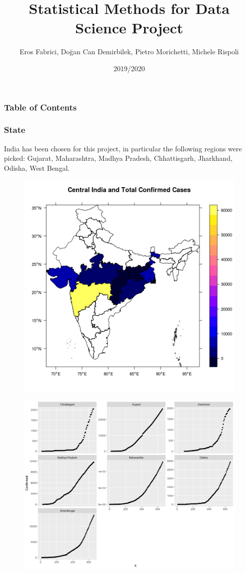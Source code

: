 \documentclass{beamer}
\title{Statistical Methods for Data Science Project}
\author{Eros Fabrici, Doğan Can Demirbilek, Pietro Morichetti, Michele Rispoli}
\institute{University of Trieste}
\date{2019/2020}
\begin{document}
\frame{\titlepage}

\begin{frame}
\frametitle{Table of Contents}
\tableofcontents
\end{frame}

\begin{frame}
\frametitle{State}
India has been chosen for this project, in particular the following regions were picked: Gujarat, Maharashtra, Madhya Pradesh, Chhattisgarh, Jharkhand, Odisha, West Bengal.
\end{frame}

\begin{frame}
\begin{figure}
	\includegraphics[width=\linewidth, height=\textheight]{../plots/map_plot.png}
\end{figure}
\end{frame}

\begin{frame}
\begin{figure}
	\includegraphics[width=\linewidth, height=\textheight]{../plots/confirmed_facets.png}
\end{figure}
\end{frame}
\end{document}
